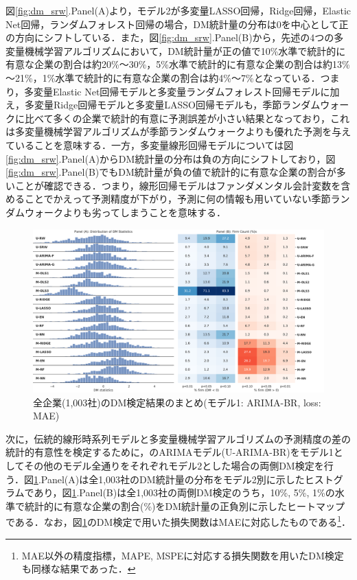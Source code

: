 \documentclass[a4paper，12pt]{jsarticle}
\begin{document}
図\ref{fig:dm_srw}.Panel(A)より，モデル2が多変量LASSO回帰，Ridge回帰，Elastic Net回帰，ランダムフォレスト回帰の場合，DM統計量の分布は0を中心として正の方向にシフトしている．また，図\ref{fig:dm_srw}.Panel(B)から，先述の4つの多変量機械学習アルゴリズムにおいて，DM統計量が正の値で10\%水準で統計的に有意な企業の割合は約20\%～30\%，5\%水準で統計的に有意な企業の割合は約13\%～21\%，1\%水準で統計的に有意な企業の割合は約4\%～7\%となっている．つまり，多変量Elastic Net回帰モデルと多変量ランダムフォレスト回帰モデルに加え，多変量Ridge回帰モデルと多変量LASSO回帰モデルも，季節ランダムウォークに比べて多くの企業で統計的有意に予測誤差が小さい結果となっており，これは多変量機械学習アルゴリズムが季節ランダムウォークよりも優れた予測を与えていることを意味する．一方，多変量線形回帰モデルについては図\ref{fig:dm_srw}.Panel(A)からDM統計量の分布は負の方向にシフトしており，図\ref{fig:dm_srw}.Panel(B)でもDM統計量が負の値で統計的に有意な企業の割合が多いことが確認できる．つまり，線形回帰モデルはファンダメンタル会計変数を含めることでかえって予測精度が下がり，予測に何の情報も用いていない季節ランダムウォークよりも劣ってしまうことを意味する．

\begin{figure}
  \centering
  \caption{全企業(1,003社)のDM検定結果のまとめ(モデル1: ARIMA-BR, loss: MAE)}
  \label{fig:dm_sarima_br}
  \includegraphics[width=15cm]{./img/_dm_MAD_y_hat_sarima_br.pdf}
\end{figure}

次に，伝統的線形時系列モデルと多変量機械学習アルゴリズムの予測精度の差の統計的有意性を検定するために，\cite{brown1979univariate}のARIMAモデル(U-ARIMA-BR)をモデル1としてその他のモデル全通りをそれぞれモデル2とした場合の両側DM検定を行う．図\ref{fig:dm_sarima_br}.Panel(A)は全1,003社のDM統計量の分布をモデル2別に示したヒストグラムであり，図\ref{fig:dm_sarima_br}.Panel(B)は全1,003社の両側DM検定のうち，10\%, 5\%, 1\%の水準で統計的に有意な企業の割合(\%)をDM統計量の正負別に示したヒートマップである．なお，図\ref{fig:dm_sarima_br}のDM検定で用いた損失関数はMAEに対応したものである\footnote{MAE以外の精度指標，MAPE, MSPEに対応する損失関数を用いたDM検定も同様な結果であった．}．
\end{document}
